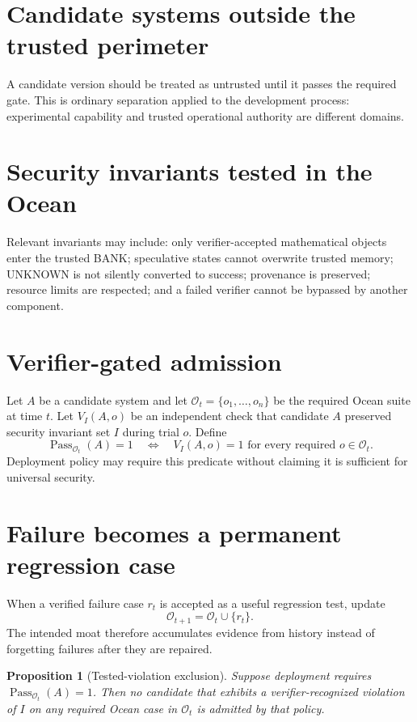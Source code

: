 \documentclass[11pt,oneside]{book}
\newtheorem{proposition}[theorem]{Proposition}
\theoremstyle{definition}
\theoremstyle{remark}
\begin{document}
\section{Candidate systems outside the trusted perimeter}
A candidate version should be treated as untrusted until it passes the required gate. This is ordinary separation applied to the development process: experimental capability and trusted operational authority are different domains.

\section{Security invariants tested in the Ocean}
Relevant invariants may include: only verifier-accepted mathematical objects enter the trusted BANK; speculative states cannot overwrite trusted memory; UNKNOWN is not silently converted to success; provenance is preserved; resource limits are respected; and a failed verifier cannot be bypassed by another component.

\section{Verifier-gated admission}
Let $A$ be a candidate system and let $\mathcal O_t=\{o_1,\ldots,o_n\}$ be the required Ocean suite at time $t$. Let $V_I(A,o)$ be an independent check that candidate $A$ preserved security invariant set $I$ during trial $o$. Define
\[
\operatorname{Pass}_{\mathcal O_t}(A)=1
\quad\Longleftrightarrow\quad
V_I(A,o)=1\text{ for every required }o\in\mathcal O_t.
\]
Deployment policy may require this predicate without claiming it is sufficient for universal security.

\section{Failure becomes a permanent regression case}
\label{sec:ocean-regression}
When a verified failure case $r_t$ is accepted as a useful regression test, update
\[
\mathcal O_{t+1}=\mathcal O_t\cup\{r_t\}.
\]
The intended moat therefore accumulates evidence from history instead of forgetting failures after they are repaired.

\begin{proposition}[Tested-violation exclusion]
Suppose deployment requires $\operatorname{Pass}_{\mathcal O_t}(A)=1$. Then no candidate that exhibits a verifier-recognized violation of $I$ on any required Ocean case in $\mathcal O_t$ is admitted by that policy.
\end{proposition}
\end{document}
